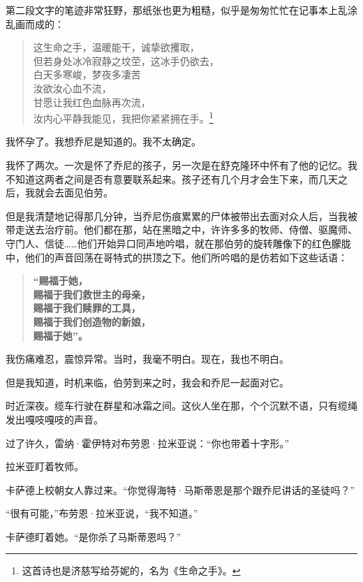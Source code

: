 \documentclass[AutoFakeBold=true]{book}
\begin{document}
第二段文字的笔迹非常狂野，那纸张也更为粗糙，似乎是匆匆忙忙在记事本上乱涂乱画而成的：

\begin{quote}
	{\kaishu 这生命之手，温暖能干，诚挚欲攫取，\\
	但若身处冰冷寂静之坟茔，这冰手仍欲去，\\
	白天多寒峻，梦夜多凄苦\\
	汝欲汝心血不流，\\
	甘愿让我红色血脉再次流，\\
	汝内心平静我能见，我把你紧紧拥在手。}\footnote{这首诗也是济慈写给芬妮的，名为《生命之手》。}
\end{quote}

我怀孕了。我想乔尼是知道的。我不太确定。

我怀了两次。一次是怀了乔尼的孩子，另一次是在舒克隆环中怀有了他的记忆。我不知道这两者之间是否有意要联系起来。孩子还有几个月才会生下来，而几天之后，我就会去面见伯劳。

但是我清楚地记得那几分钟，当乔尼伤痕累累的尸体被带出去面对众人后，当我被带走送去治疗前。他们都在那，站在黑暗之中，许许多多的牧师、侍僧、驱魔师、守门人、信徒……他们开始异口同声地吟唱，就在那伯劳的旋转雕像下的红色朦胧中，他们的声音回荡在哥特式的拱顶之下。他们所吟唱的是仿若如下这些话语：

\begin{quote}
	{\bf \kaishu ``赐福于她，\\
	赐福于我们救世主的母亲，\\
	赐福于我们赎罪的工具，\\
	赐福于我们创造物的新娘，\\
	赐福于她''。}
\end{quote}

我伤痛难忍，震惊异常。当时，我毫不明白。现在，我也不明白。

但是我知道，时机来临，伯劳到来之时，我会和乔尼一起面对它。

\vspace*{1em}

时近深夜。缆车行驶在群星和冰霜之间。这伙人坐在那，个个沉默不语，只有缆绳发出嘎吱嘎吱的声音。

过了许久，雷纳·霍伊特对布劳恩·拉米亚说：``你也带着十字形。''

拉米亚盯着牧师。

卡萨德上校朝女人靠过来。``你觉得海特·马斯蒂恩是那个跟乔尼讲话的圣徒吗？''

``很有可能，''布劳恩·拉米亚说，``我不知道。''

卡萨德盯着她。``是你杀了马斯蒂恩吗？''
\end{document}
